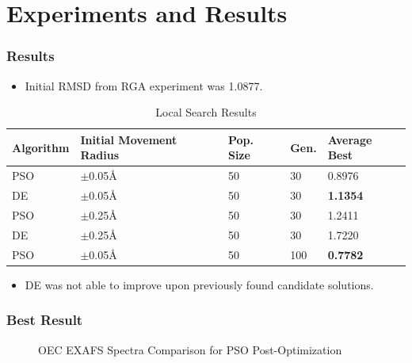 \documentclass[10pt]{beamer}
\begin{document}
\section{Experiments and Results}

\begin{frame}
	\frametitle{Results}

	\begin{itemize}
		\item Initial RMSD from RGA experiment was 1.0877.
	\end{itemize}

	\begin{table}
		\caption{Local Search Results}
		\centering
		\begin{tabular}{ | l | l | l | l | l | }
		  \hline
		    Algorithm & Initial Movement Radius & Pop. Size & Gen. & Average Best \\ \hline \hline
		    PSO & $\pm$0.05\AA & 50 & 30 & 0.8976 \\ \hline
		    DE & $\pm$0.05\AA & 50 & 30 & \textbf{1.1354} \\ \hline
		    PSO & $\pm$0.25\AA & 50 & 30 & 1.2411 \\ \hline
		    DE & $\pm$0.25\AA & 50 & 30 & 1.7220 \\ \hline \hline

		    PSO & $\pm$0.05\AA & 50 & 100 & \textbf{0.7782} \\ \hline
		\end{tabular}
	\end{table}

	\begin{itemize}
		\item DE was not able to improve upon previously found candidate solutions.
	\end{itemize}

\end{frame}

\begin{frame}
	\frametitle{Best Result}

	\begin{figure}
		\caption{OEC EXAFS Spectra Comparison for PSO Post-Optimization}
	\end{figure}

\end{frame}
\end{document}
